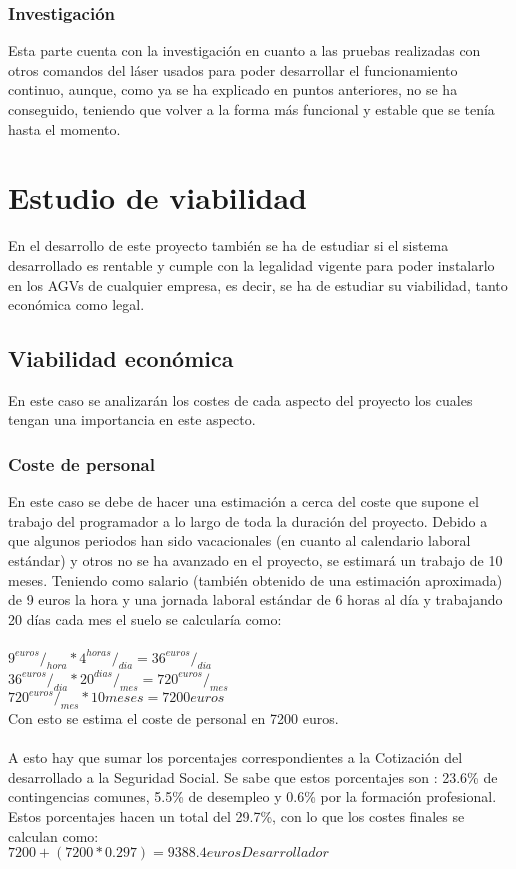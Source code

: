 \subsubsection{Investigación}
Esta parte cuenta con la investigación en cuanto a las pruebas realizadas con otros comandos del láser usados para poder desarrollar el funcionamiento continuo, aunque, como ya se ha explicado en puntos anteriores, no se ha conseguido, teniendo que volver a la forma más funcional y estable que se tenía hasta el momento.

\section{Estudio de viabilidad}
En el desarrollo de este proyecto también se ha de estudiar si el sistema desarrollado es rentable y cumple con la legalidad vigente para poder instalarlo en los AGVs de cualquier empresa, es decir, se ha de estudiar su viabilidad, tanto económica como legal.\\

\subsection{Viabilidad económica}
En este caso se analizarán los costes de cada aspecto del proyecto los cuales tengan una importancia en este aspecto.

\subsubsection{Coste de personal}
En este caso se debe de hacer una estimación a cerca del coste que supone el trabajo del programador a lo largo de toda la duración del proyecto. Debido a que algunos periodos han sido vacacionales (en cuanto al calendario laboral estándar) y otros no se ha avanzado en el proyecto, se estimará un trabajo de 10 meses. Teniendo como salario (también obtenido de una estimación aproximada) de 9 euros la hora y una jornada laboral estándar de 6 horas al día y trabajando 20 días cada mes el suelo se calcularía como: \\
\\
$9 ^{euros}/_{hora} * 4 ^{horas}/_{dia} = 36 ^{euros}/_{dia}$ \\
$36 ^{euros}/_{dia} * 20 ^{dias}/_{mes} = 720 ^{euros}/_{mes}$ \\
$720 ^{euros}/_{mes} * 10 meses = 7200 euros$ \\
Con esto se estima el coste de personal en 7200 euros.\\
\\
A esto hay que sumar los porcentajes correspondientes a la Cotización del desarrollado a la Seguridad Social. Se sabe que estos porcentajes son : 23.6\% de contingencias comunes, 5.5\% de desempleo y 0.6\% por la formación profesional. Estos porcentajes hacen un total del 29.7\%, con lo que los costes finales se calculan como:\\
$7200 + (7200 * 0.297) = 9388.4 eurosDesarrollador$\\

